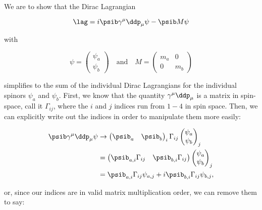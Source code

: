 \section{}

We are to show that the Dirac Lagrangian

\begin{equation}
    \lag = i\psib \gamma^{\mu}\ddp_{\mu} \psi - \psib M \psi
\end{equation}

with 

\begin{equation}
    \psi = \begin{pmatrix}\psi_a \\ \psi_b\end{pmatrix} \quad\mathrm{and}\quad M = \begin{pmatrix}m_a & 0 \\ 0 & m_b\end{pmatrix}
\end{equation}

simplifies to the sum of the individual Dirac Lagrangians for the individual spinors $\psi_a$ and $\psi_b$. First, we know that the quantity $\gamma^{\mu}\ddp_{\mu}$ is a matrix in spin-space, call it $\Gamma_{ij}$, where the $i$ and $j$ indices run from $1-4$ in spin space. Then, we can explicitly write out the indices in order to manipulate them more easily:

\begin{align}
    \psib \gamma^{\mu}\ddp_{\mu} \psi &\rightarrow \begin{pmatrix}\psib_a & \psib_b\end{pmatrix}_i \Gamma_{ij} \begin{pmatrix}\psi_a \\ \psi_b\end{pmatrix}_j \\
    &= \begin{pmatrix}\psib_{a,i} \Gamma_{ij} & \psib_{b,i}\Gamma_{ij}\end{pmatrix} \begin{pmatrix}\psi_a \\ \psi_b\end{pmatrix}_j \\
    &= \psib_{a,i}\Gamma_{ij}\psi_{a,j} + i\psib_{b,i}\Gamma_{ij}\psi_{b,j},
\end{align}

or, since our indices are in valid matrix multiplication order, we can remove them to say:

